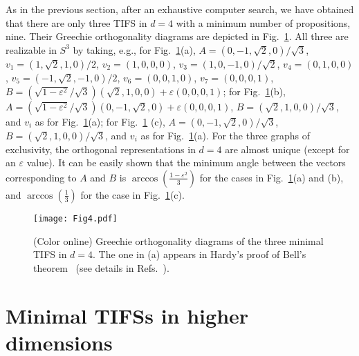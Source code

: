 \documentclass[%
 twocolumn,
 groupedaddress,
 showpacs,
 showkeys,
 preprintnumbers,
 amsmath,amssymb,
 aps,
 pra,
 longbibliography,
 floatfix,
 ]{revtex4-1}
\begin{document}

As in the previous section, after an exhaustive computer search, 
we have obtained that there are only three TIFS in $d=4$ with a minimum number of propositions, nine. Their Greechie orthogonality diagrams are depicted in Fig.~\ref{fig:d4}. All three are realizable in $S^3$ by taking, e.g.,
		for Fig.~\ref{fig:d4}(a),
		$A = ({0,-1,\sqrt{2},0} )/\sqrt{3}$,
		$v_1 = ({1,\sqrt{2},1,0} )/ 2 $,
		$v_2 = ({1,0,0,0} )$,
		$v_3 = ({1,0,-1,0} )/\sqrt{2}$,
		$v_4 = ({0,1,0,0} ) $,
		$v_5 = ({-1,\sqrt{2},-1,0} )/ 2$,
		$v_6 = ({0,0,1,0} ) $,
		$v_7 = ({0,0,0,1} )$,
		$B = (\sqrt{1-\varepsilon^2} / \sqrt{3}) ({\sqrt{2},1,0,0})+\varepsilon({0,0,0,1})$;
		for Fig.~\ref{fig:d4}(b),
		$A = (\sqrt{1-\varepsilon^2} / \sqrt{3})({0,-1,\sqrt{2},0} )+\varepsilon({0,0,0,1})$,
		$B = ({\sqrt{2},1,0,0} )/\sqrt{3}$, and $v_i$ as for Fig.~\ref{fig:d4}(a);
		for Fig.~\ref{fig:d4} (c),
		$A = ({0,-1,\sqrt{2},0} )/\sqrt{3}$,
		$B = ({\sqrt{2},1,0,0} ) /\sqrt{3}$, and $v_i$ as for Fig.~\ref{fig:d4}(a).
For the three graphs of exclusivity, the orthogonal representations in $d=4$ are almost unique (except for an $\varepsilon$ value). 
It can be easily shown that the minimum angle between the vectors corresponding to $A$ and $B$ is $\arccos\left(\frac{1-\varepsilon^2}{3}\right)$ 
for the cases in Fig.~\ref{fig:d4}(a) and (b), and $\arccos\left(\frac{1}{3}\right)$ for the case in Fig.~\ref{fig:d4}(c).


\begin{figure}[hbtp]
		\texttt{[image: Fig4.pdf]} 
	\caption{\label{fig:d4}
		(Color online)
		Greechie orthogonality diagrams of the three minimal
		TIFS in $d=4$. The one in (a) appears 
		in Hardy's proof of Bell's theorem~\cite{Hardy93} (see details in Refs.\ \cite{CEG96,Cabello96,BBC11}).}
\end{figure}


\section{Minimal TIFSs in higher dimensions}

\end{document}
